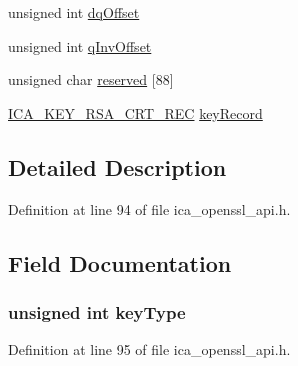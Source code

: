 \begin{DoxyCompactItemize}
\item 
unsigned int \hyperlink{struct___i_c_a___k_e_y___r_s_a___c_r_t_a1ba5683fb3cdc51a12f3e4711b3bd516}{dq\+Offset}
\item 
unsigned int \hyperlink{struct___i_c_a___k_e_y___r_s_a___c_r_t_ab0053b4d93cadfcf985c40d75e4f30a8}{q\+Inv\+Offset}
\item 
unsigned char \hyperlink{struct___i_c_a___k_e_y___r_s_a___c_r_t_a0c6a09f3ccdc83ff1c0b9447bd861e8e}{reserved} \mbox{[}88\mbox{]}
\item 
\hyperlink{ica__openssl__api_8h_a1f11101dc6bf8d7e2faf94b36567baab}{I\+C\+A\+\_\+\+K\+E\+Y\+\_\+\+R\+S\+A\+\_\+\+C\+R\+T\+\_\+\+R\+EC} \hyperlink{struct___i_c_a___k_e_y___r_s_a___c_r_t_a18b0c4a1fbf1a38eef1862ed66f3b707}{key\+Record}
\end{DoxyCompactItemize}


\subsection{Detailed Description}


Definition at line 94 of file ica\+\_\+openssl\+\_\+api.\+h.



\subsection{Field Documentation}
\subsubsection[{\texorpdfstring{key\+Type}{keyType}}]{\setlength{\rightskip}{0pt plus 5cm}unsigned int key\+Type}\hypertarget{struct___i_c_a___k_e_y___r_s_a___c_r_t_a95d86e5c4ec0986957452a5988dfed1b}{}\label{struct___i_c_a___k_e_y___r_s_a___c_r_t_a95d86e5c4ec0986957452a5988dfed1b}


Definition at line 95 of file ica\+\_\+openssl\+\_\+api.\+h.

